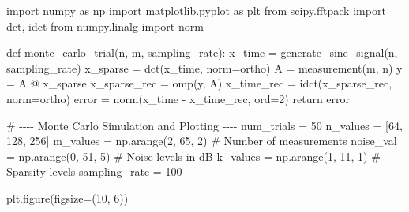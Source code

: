 \documentclass[
  letterpaper,
  DIV=11,
  numbers=noendperiod]{scrartcl}
\newenvironment{Shaded}{\begin{snugshade}}{\end{snugshade}}
\newcommand{\BuiltInTok}[1]{\textcolor[rgb]{0.40,0.85,0.94}{#1}}
\newcommand{\CommentTok}[1]{\textcolor[rgb]{0.46,0.44,0.37}{#1}}
\newcommand{\ControlFlowTok}[1]{\textcolor[rgb]{0.98,0.15,0.45}{#1}}
\newcommand{\DecValTok}[1]{\textcolor[rgb]{0.68,0.51,1.00}{#1}}
\newcommand{\ImportTok}[1]{\textcolor[rgb]{0.98,0.15,0.45}{#1}}
\newcommand{\KeywordTok}[1]{\textcolor[rgb]{0.98,0.15,0.45}{#1}}
\newcommand{\NormalTok}[1]{\textcolor[rgb]{0.97,0.97,0.95}{#1}}
\newcommand{\OperatorTok}[1]{\textcolor[rgb]{0.97,0.97,0.95}{#1}}
\newcommand{\StringTok}[1]{\textcolor[rgb]{0.90,0.86,0.45}{#1}}
\begin{document}
\begin{Shaded}
\begin{Highlighting}[]
\ImportTok{import}\NormalTok{ numpy }\ImportTok{as}\NormalTok{ np}
\ImportTok{import}\NormalTok{ matplotlib.pyplot }\ImportTok{as}\NormalTok{ plt}
\ImportTok{from}\NormalTok{ scipy.fftpack }\ImportTok{import}\NormalTok{ dct, idct}
\ImportTok{from}\NormalTok{ numpy.linalg }\ImportTok{import}\NormalTok{ norm}

\KeywordTok{def}\NormalTok{ monte\_carlo\_trial(n, m, sampling\_rate):}
\NormalTok{    x\_time }\OperatorTok{=}\NormalTok{ generate\_sine\_signal(n, sampling\_rate)}
\NormalTok{    x\_sparse }\OperatorTok{=}\NormalTok{ dct(x\_time, norm}\OperatorTok{=}\StringTok{\textquotesingle{}ortho\textquotesingle{}}\NormalTok{)}
\NormalTok{    A }\OperatorTok{=}\NormalTok{ measurement(m, n)}
\NormalTok{    y }\OperatorTok{=}\NormalTok{ A }\OperatorTok{@}\NormalTok{ x\_sparse}
\NormalTok{    x\_sparse\_rec }\OperatorTok{=}\NormalTok{ omp(y, A)}
\NormalTok{    x\_time\_rec }\OperatorTok{=}\NormalTok{ idct(x\_sparse\_rec, norm}\OperatorTok{=}\StringTok{\textquotesingle{}ortho\textquotesingle{}}\NormalTok{)}
\NormalTok{    error }\OperatorTok{=}\NormalTok{ norm(x\_time }\OperatorTok{{-}}\NormalTok{ x\_time\_rec, }\BuiltInTok{ord}\OperatorTok{=}\DecValTok{2}\NormalTok{)}
    \ControlFlowTok{return}\NormalTok{ error}

\CommentTok{\# {-}{-}{-}{-} Monte Carlo Simulation and Plotting {-}{-}{-}{-}}
\NormalTok{num\_trials }\OperatorTok{=} \DecValTok{50}
\NormalTok{n\_values }\OperatorTok{=}\NormalTok{ [}\DecValTok{64}\NormalTok{, }\DecValTok{128}\NormalTok{, }\DecValTok{256}\NormalTok{]}
\NormalTok{m\_values }\OperatorTok{=}\NormalTok{ np.arange(}\DecValTok{2}\NormalTok{, }\DecValTok{65}\NormalTok{, }\DecValTok{2}\NormalTok{)  }\CommentTok{\# Number of measurements}
\NormalTok{noise\_val }\OperatorTok{=}\NormalTok{ np.arange(}\DecValTok{0}\NormalTok{, }\DecValTok{51}\NormalTok{, }\DecValTok{5}\NormalTok{)  }\CommentTok{\# Noise levels in dB}
\NormalTok{k\_values }\OperatorTok{=}\NormalTok{ np.arange(}\DecValTok{1}\NormalTok{, }\DecValTok{11}\NormalTok{, }\DecValTok{1}\NormalTok{)  }\CommentTok{\# Sparsity levels}
\NormalTok{sampling\_rate }\OperatorTok{=} \DecValTok{100}

\NormalTok{plt.figure(figsize}\OperatorTok{=}\NormalTok{(}\DecValTok{10}\NormalTok{, }\DecValTok{6}\NormalTok{))}


\end{Highlighting}
\end{Shaded}
\end{document}
